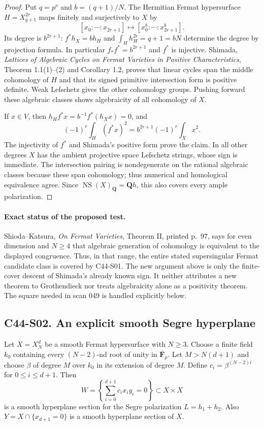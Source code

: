 \begin{proof}
Put $q=p^\nu$ and $b=(q+1)/N$.  The Hermitian Fermat
hypersurface $H=X_{q+1}^{2r}$ maps finitely and surjectively to
$X$ by
\[
 [x_0:\cdots:x_{2r+1}]
 \longmapsto[x_0^b:\cdots:x_{2r+1}^b].
\]
Its degree is $b^{2r+1}$: $f^*h_X=bh_H$ and
$\int_Hh_H^{2r}=q+1=bN$ determine the degree by projection
formula.  In particular $f_*f^*=b^{2r+1}$ and $f^*$ is injective.
Shimada, \emph{Lattices of Algebraic Cycles on Fermat Varieties
in Positive Characteristics}, Theorem 1.1(1)--(2) and
Corollary 1.2, proves that linear cycles span the middle
cohomology of $H$ and that its signed primitive intersection
form is positive definite.  Weak Lefschetz gives the other
cohomology groups.  Pushing forward these algebraic classes
shows algebraicity of all cohomology of $X$.

If $x\in V$, then
$h_Hf^*x=b^{-1}f^*(h_Xx)=0$, and
\[
 (-1)^r\int_H(f^*x)^2
  =b^{2r+1}(-1)^r\int_Xx^2.
\]
The injectivity of $f^*$ and Shimada's positive form prove the
claim.  In all other degrees $X$ has the ambient projective
space Lefschetz strings, whose sign is immediate.  The
intersection pairing is nondegenerate on the rational
algebraic classes because these span cohomology; thus
numerical and homological equivalence agree.  Since
$\operatorname{NS}(X)_\mathbf Q=\mathbf Qh$, this also covers
every ample polarization.
\end{proof}

\paragraph{Exact status of the proposed test.}
Shioda--Katsura, \emph{On Fermat Varieties}, Theorem II,
printed p.~97, says for even dimension and $N\geq4$ that
algebraic generation of cohomology is equivalent to the
displayed congruence.  Thus, in that range, the entire stated
supersingular Fermat candidate class is covered by C44-S01.
The new argument above is only the finite-cover descent
of Shimada's already known sign.  It neither attributes a
new theorem to Grothendieck nor treats algebraicity alone as
a positivity theorem.  The square needed in scan 049 is
handled explicitly below.

\subsection*{C44-S02. An explicit smooth Segre hyperplane}

\begin{proposition}[C44-S02; unconditional]
Let $X=X_N^d$ be a smooth Fermat hypersurface with $N\geq3$.
Choose a finite field $k_0$ containing every $(N-2)$-nd root
of unity in $\overline{\mathbf F}_p$.  Let $M>N(d+1)$ and
choose $\beta$ of degree $M$ over $k_0$ in its extension of
degree $M$.  Define $c_i=\beta^{(N-2)i}$ for
$0\leq i\leq d+1$.  Then
\[
 W=\left\{\sum_{i=0}^{d+1}c_ix_iy_i=0\right\}
       \subset X\times X
\]
is a smooth hyperplane section for the Segre polarization
$L=h_1+h_2$.  Also $Y=X\cap\{x_{d+1}=0\}$ is a smooth
hyperplane section of $X$.
\end{proposition}

